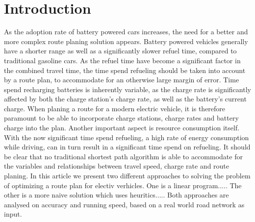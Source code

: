\section{Introduction}
	As the adoption rate of battery powered cars increases, the need for a better and more complex route planing solution appears. Battery powered vehicles generally have a shorter range as well as a significantly slower refuel time, compared to traditional gasoline cars. As the refuel time have become a significant factor in the combined travel time, the time spend refueling should be taken into account by a route plan, to accommodate for an otherwise large margin of error.
	Time spend recharging batteries is inherently variable, as the charge rate is significantly affected by both the charge station’s charge rate, as well as the battery’s current charge. When planing a route for a modern electric vehicle, it is therefore paramount to be able to incorporate charge stations, charge rates and battery charge into the plan.
	Another important aspect is resource consumption itself. With the now significant time spend refueling, a high rate of energy consumption while driving, can in turn result in a significant time spend on refueling.
	It should be clear that no traditional shortest path algorithm is able to accommodate for the variables and relationships between travel speed, charge rate and route planing. In this article we present two different approaches to solving the problem of optimizing a route plan for electiv verhicles. One is a linear program..... The other is a more naive solution which uses heuritics..... Both approaches are analysed on accuracy and running speed, based on a real world road network as input.

